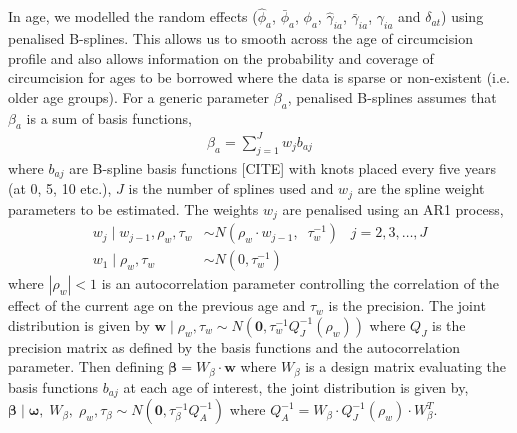 \documentclass{article}
\begin{document}
\begin{appendix}
In age, we modelled the random effects ($\hat{\phi}_a$, $\bar{\phi}_a$, $\phi_a$, $\hat{\gamma}_{ia}$, $\bar{\gamma}_{ia}$, $\gamma_{ia}$ and $\delta_{at}$) using penalised B-splines. This allows us to smooth across the age of circumcision profile and also allows information on the probability and coverage of circumcision for ages to be borrowed where the data is sparse or non-existent (i.e. older age groups). For a generic parameter $\beta_a$, penalised B-splines assumes that $\beta_a$ is a sum of basis functions, 
\begin{align*} 
	\beta_a = \sum_{j = 1}^{J} w_{j}b_{aj}
\end{align*} 
where $b_{aj}$ are B-spline basis functions {\color{red}[CITE]} with knots placed every five years (at 0, 5, 10 etc.), $J$ is the number of splines used and $w_{j}$ are the spline weight parameters to be estimated. The weights $w_{j}$ are penalised using an AR1 process, 
\begin{align*} 
  w_{j} \; | \; w_{j-1}, \rho_{w}, \tau_{w} &\sim N(\rho_{w} \cdot w_{j-1}, \;\; \tau^{-1}_{w}) \;\;\;  j = 2, 3,\ldots, J \\
  w_{1} \; | \; \rho_{w}, \tau_{w} &\sim N(0, \tau^{-1}_{w}) 
\end{align*}
where $|\rho_{w}| < 1$ is an autocorrelation parameter controlling the correlation of the effect of the current age on the previous age and $\tau_{w}$ is the precision. The joint distribution is given by $\boldsymbol{w}\; | \; \rho_{w}, \tau_{w} \sim N(\boldsymbol{0}, \tau_{w}^{-1}Q^{-1}_{J}(\rho_{w}))$ where $Q_{J}$ is the precision matrix as defined by the basis functions and the autocorrelation parameter. Then defining $\boldsymbol{\beta} = W_{\beta}\cdot \boldsymbol{w}$ where $W_{\beta}$ is a design matrix evaluating the basis functions $b_{aj}$ at each age of interest, the joint distribution is given by, $\boldsymbol{\beta}\; | \;\boldsymbol{\omega}, \; W_{\beta}, \; \rho_{w}, \tau_{\beta} \sim N(\boldsymbol{0}, \tau_{\beta}^{-1}Q^{-1}_{A})$ where $Q^{-1}_{A} = W_{\beta}\cdot Q^{-1}_{J}(\rho_{w})\cdot W_{\beta}^T$.


\end{appendix}
\end{document}
